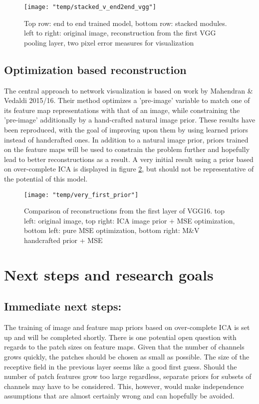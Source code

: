 \documentclass{article}
\begin{document}
\begin{figure}
	\centering
	\texttt{[image: "temp/stacked\_v\_end2end\_vgg"]}
	\caption{Top row: end to end trained model, bottom row: stacked modules. 
		left to right: original image, reconstruction from the first VGG pooling layer, two pixel error measures for visualization}
	\label{fig:stack_v_end2end}
\end{figure}

\subsection{Optimization based reconstruction}

The central approach to network visualization is based on work by Mahendran \& Vedaldi 2015/16. Their method optimizes a 'pre-image' variable to match one of its feature map representations with that of an image, while constraining the 'pre-image' additionally by a hand-crafted natural image prior. These results have been reproduced, with the goal of improving upon them by using learned priors instead of handcrafted ones. In addition to a natural image prior, priors trained on the feature maps will be used to constrain the problem further and hopefully lead to better reconstructions as a result. A very initial result using a prior based on over-complete ICA is displayed in figure \ref{fig:first_ica}, but should not be representative of the potential of this model.

\begin{figure}
	\centering
	\texttt{[image: "temp/very\_first\_prior"]}
	\caption{Comparison of reconstructions from the first layer of VGG16.
		top left: original image, top right: ICA image prior + MSE optimization, bottom left: pure MSE optimization, bottom right: M\&V handcrafted prior + MSE}
	\label{fig:first_ica}
\end{figure}



\FloatBarrier
\section{Next steps and research goals}

\subsection{Immediate next steps:}

The training of image and feature map priors based on over-complete ICA is set up and will be completed shortly. There is one potential open question with regards to the patch sizes on feature maps. Given that the number of channels grows quickly, the patches should be chosen as small as possible. The size of the receptive field in the previous layer seems like a good first guess. Should the number of patch features grow too large regardless, separate priors for subsets of channels may have to be considered. This, however, would make independence assumptions that are almost certainly wrong and can hopefully be avoided. 
\end{document}

